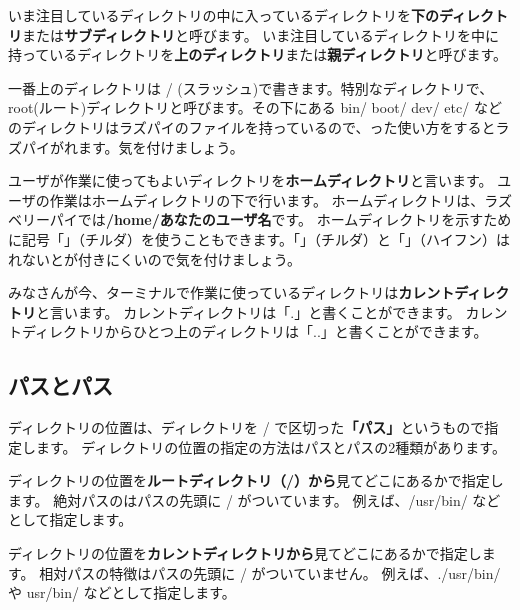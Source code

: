 
いま注目しているディレクトリの中に入っているディレクトリを{\bf 下のディレクトリ}または{\bf サブディレクトリ}と呼びます。
いま注目しているディレクトリを中に持っているディレクトリを{\bf 上のディレクトリ}または{\bf 親ディレクトリ}と呼びます。


一番上のディレクトリは / (スラッシュ)で書きます。特別なディレクトリで、root(ルート)ディレクトリと呼びます。その下にある bin/ boot/ dev/ etc/ などのディレクトリはラズパイのファイルを持っているので、った使い方をするとラズパイがれます。気を付けましょう。


ユーザが作業に使ってもよいディレクトリを{\bf ホームディレクトリ}と言います。
ユーザの作業はホームディレクトリの下で行います。
ホームディレクトリは、ラズベリーパイでは{\bf /home/あなたのユーザ名}です。
ホームディレクトリを示すために記号「\code{\textasciitilde}」（チルダ）を使うこともできます。「\code{\textasciitilde}」（チルダ）と「\code{-}」（ハイフン）はれないとが付きにくいので気を付けましょう。


みなさんが今、ターミナルで作業に使っているディレクトリは{\bf カレントディレクトリ}と言います。
カレントディレクトリは「.」と書くことができます。
カレントディレクトリからひとつ上のディレクトリは「..」と書くことができます。

\subsection{パスとパス}
ディレクトリの位置は、ディレクトリを / で区切った{\bf 「パス」}というもので指定します。
ディレクトリの位置の指定の方法はパスとパスの2種類があります。


ディレクトリの位置を{\bf ルートディレクトリ（/）から}見てどこにあるかで指定します。
絶対パスのはパスの先頭に / がついています。
例えば、/usr/bin/ などとして指定します。


ディレクトリの位置を{\bf カレントディレクトリから}見てどこにあるかで指定します。
相対パスの特徴はパスの先頭に / がついていません。
例えば、./usr/bin/ や usr/bin/ などとして指定します。


